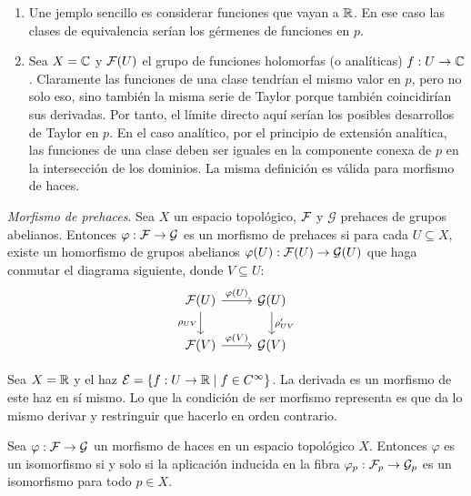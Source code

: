 \documentclass[GA.tex]{subfiles}
\begin{document}
\begin{ejs}
\begin{enumerate}
\item Une jemplo sencillo es considerar funciones que vayan a $\mathbb{R}$. En ese caso las clases de equivalencia serían los gérmenes de funciones en $p$. 

\item Sea $X=\mathbb{C}$ y $\mathcal{F}(U)$ el grupo de funciones holomorfas (o analíticas) $f:U\to\mathbb{C}$. Claramente las funciones de una clase tendrían el mismo valor en $p$, pero no solo eso, sino también la misma serie de Taylor porque también coincidirían sus derivadas. Por tanto, el límite directo aquí serían los posibles desarrollos de Taylor en $p$. En el caso analítico, por el principio de extensión analítica, las funciones de una clase deben ser iguales en la componente conexa de $p$ en la intersección de los dominios. La misma definición es válida para morfismo de haces. 
\end{enumerate}
\end{ejs}


\begin{defi}
\emph{Morfismo de prehaces}. Sea $X$ un espacio topológico, $\mathcal{F}$ y $\mathcal{G}$ prehaces de grupos abelianos. Entonces $\varphi:\mathcal{F}\to\mathcal{G}$ es un morfismo de prehaces si para cada $U\subseteq X$, existe un homorfismo de grupos abelianos $\varphi(U):\mathcal{F}(U)\to\mathcal{G}(U)$ que haga conmutar el diagrama siguiente, donde $V\subseteq U$:
\[
\begin{tikzcd}
\calF(U)\arrow[r, "\varphi(U)"]\arrow[d, "\rho_{UV}"'] & \calG(U)\arrow[d, "\rho'_{UV}"]\\
\calF(V)\arrow[r, "\varphi(V)"] & \calG(V)
\end{tikzcd}
\]
\end{defi}

\begin{ej}
Sea $X=\mathbb{R}$ y el haz $\mathcal{E}=\{f:U\to \mathbb{R}\mid f\in C^{\infty}\}$. La derivada es un morfismo de este haz en sí mismo. Lo que la condición de ser morfismo representa es que da lo mismo derivar y restringuir que hacerlo en orden contrario.
\end{ej}


\begin{prop}
Sea $\varphi:\mathcal{F}\to\mathcal{G}$ un morfismo de haces en un espacio topológico $X$. Entonces $\varphi$ es un isomorfismo si y solo si la aplicación inducida en la fibra $\varphi_p:\mathcal{F}_p\to\mathcal{G}_p$ es un isomorfismo para todo $p\in X$.
\end{prop}
\end{document}
